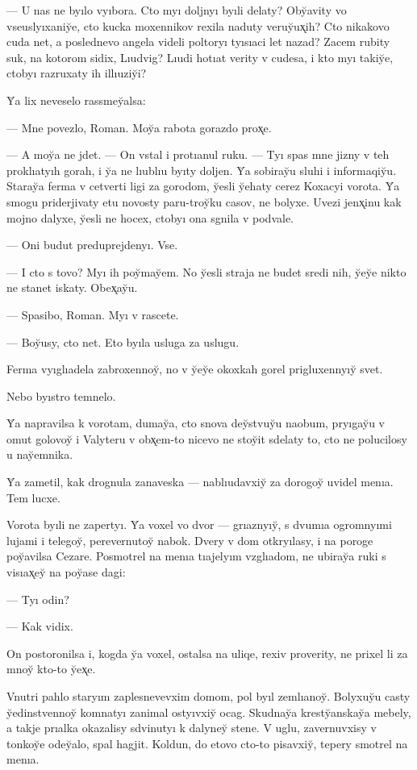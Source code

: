 \documentclass[10pt]{book}
\begin{document}
— U nas ne byılo vyıbora. Cto myı doljnyı byıli delaty? Oby̆avity vo vseuslyıxaniy̆e, cto kucka moxennikov rexila naduty veruy̆ux̨ih? Cto nikakovo cuda net, a poslednevo angela videli poltoryı tyısıaci let nazad? Zacem rubity suk, na kotorom sidix, Lıudvig? Lıudi hotıat verity v cudesa, i kto myı takiy̆e, ctobyı razruxaty ih illıuziy̆i?

Y̆a lix neveselo rassmey̆alsa:

— Mne povezlo, Roman. Moy̆a rabota gorazdo prox̨e.

— A moy̆a ne jdet. — On vstal i protıanul ruku. — Tyı spas mne jizny v teh proklıatyıh gorah, i y̆a ne lıublıu byıty doljen. Y̆a sobiray̆u sluhi i informaqiy̆u. Staray̆a ferma v cetverti ligi za gorodom, y̆esli y̆ehaty cerez Koxacyi vorota. Y̆a smogu priderjivaty etu novosty paru-troy̆ku casov, ne bolyxe. Uvezi jenx̨inu kak mojno dalyxe, y̆esli ne hocex, ctobyı ona sgnila v podvale.

— Oni budut preduprejdenyı. Vse.

— I cto s tovo? Myı ih poy̆may̆em. No y̆esli straja ne budet sredi nih, y̆ey̆e nikto ne stanet iskaty. Obex̨ay̆u.

— Spasibo, Roman. Myı v rascete.

— Boy̆usy, cto net. Eto byıla usluga za uslugu.



Ferma vyıglıadela zabroxennoy̆, no v y̆ey̆e okoxkah gorel prigluxennyıy̆ svet.

Nebo byıstro temnelo.

Y̆a napravilsa k vorotam, dumay̆a, cto snova dey̆stvuy̆u naobum, pryıgay̆u v omut golovoy̆ i Valyteru v obx̨em-to nicevo ne stoy̆it sdelaty to, cto ne polucilosy u nay̆emnika.

Y̆a zametil, kak drognula zanaveska — nablıudavxiy̆ za dorogoy̆ uvidel menıa. Tem lucxe.

Vorota byıli ne zapertyı. Y̆a voxel vo dvor — grıaznyıy̆, s dvumıa ogromnyımi lujami i telegoy̆, perevernutoy̆ nabok. Dvery v dom otkryılasy, i na poroge poy̆avilsa Cezare. Posmotrel na menıa tıajelyım vzglıadom, ne ubiray̆a ruki s visıax̨ey̆ na poy̆ase dagi:

— Tyı odin?

— Kak vidix.

On postoronilsa i, kogda y̆a voxel, ostalsa na uliqe, rexiv proverity, ne prixel li za mnoy̆ kto-to y̆ex̨e.

Vnutri pahlo staryım zaplesnevevxim domom, pol byıl zemlıanoy̆. Bolyxuy̆u casty y̆edinstvennoy̆ komnatyı zanimal ostyıvxiy̆ ocag. Skudnay̆a kresty̆anskay̆a mebely, a takje prıalka okazalisy sdvinutyı k dalyney̆ stene. V uglu, zavernuvxisy v tonkoy̆e odey̆alo, spal hagjit. Koldun, do etovo cto-to pisavxiy̆, tepery smotrel na menıa.
\end{document}
